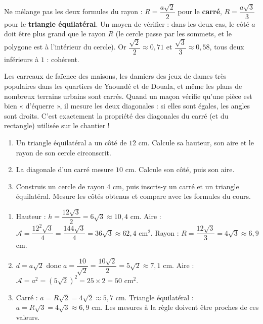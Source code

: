 \documentclass[11pt]{article}
\begin{document}
\begin{attention}
Ne mélange pas les deux formules du rayon : $R = \dfrac{a\sqrt{2}}{2}$ pour le \textbf{carré}, $R = \dfrac{a\sqrt{3}}{3}$ pour le \textbf{triangle équilatéral}. Un moyen de vérifier : dans les deux cas, le côté $a$ doit être plus grand que le rayon $R$ (le cercle passe par les sommets, et le polygone est à l'intérieur du cercle). Or $\dfrac{\sqrt{2}}{2}\approx 0,71$ et $\dfrac{\sqrt{3}}{3}\approx 0,58$, tous deux inférieurs à $1$ : cohérent.
\end{attention}

\begin{savaistu}
Les carreaux de faïence des maisons, les damiers des jeux de dames très populaires dans les quartiers de Yaoundé et de Douala, et même les plans de nombreux terrains urbains sont carrés. Quand un maçon vérifie qu'une pièce est bien « d'équerre », il mesure les deux diagonales : si elles sont égales, les angles sont droits. C'est exactement la propriété des diagonales du carré (et du rectangle) utilisée sur le chantier !
\end{savaistu}

\begin{exercice}
\begin{enumerate}
\item Un triangle équilatéral a un côté de $12$ cm. Calcule sa hauteur, son aire et le rayon de son cercle circonscrit.
\item La diagonale d'un carré mesure $10$ cm. Calcule son côté, puis son aire.
\item Construis un cercle de rayon $4$ cm, puis inscris-y un carré et un triangle équilatéral. Mesure les côtés obtenus et compare avec les formules du cours.
\end{enumerate}
\end{exercice}

\begin{corrige}[Exercice]
\begin{enumerate}
\item Hauteur : $h = \dfrac{12\sqrt{3}}{2} = 6\sqrt{3} \approx 10,4$ cm. Aire : $\mathcal{A} = \dfrac{12^2\sqrt{3}}{4} = \dfrac{144\sqrt{3}}{4} = 36\sqrt{3} \approx 62,4$ cm$^2$. Rayon : $R = \dfrac{12\sqrt{3}}{3} = 4\sqrt{3} \approx 6,9$ cm.
\item $d = a\sqrt{2}$ donc $a = \dfrac{10}{\sqrt{2}} = \dfrac{10\sqrt{2}}{2} = 5\sqrt{2} \approx 7,1$ cm. Aire : $\mathcal{A} = a^2 = (5\sqrt{2})^2 = 25\times 2 = 50$ cm$^2$.
\item Carré : $a = R\sqrt{2} = 4\sqrt{2} \approx 5,7$ cm. Triangle équilatéral : $a = R\sqrt{3} = 4\sqrt{3} \approx 6,9$ cm. Les mesures à la règle doivent être proches de ces valeurs.
\end{enumerate}
\end{corrige}
\end{document}
